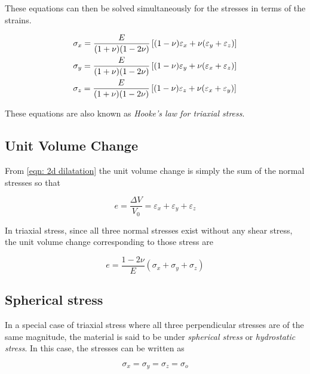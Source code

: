 \documentclass[
fontsize=10pt,
a4paper,
twosides=false,
open=any,
svgnames,
]{kaobook} %
\begin{document}
These equations can then be solved simultaneously for the stresses in terms of the strains.

\begin{equation}
  \begin{gathered}
    \sigma_x = \frac{E}{(1 + \nu )(1 - 2\nu )}\left[ (1 - \nu )\varepsilon_x + \nu (\varepsilon_y + \varepsilon_z) \right] \hfill \\
    \sigma_y = \frac{E}{(1 + \nu )(1 - 2\nu )}\left[ (1 - \nu )\varepsilon_y + \nu (\varepsilon_x + \varepsilon_z) \right] \hfill \\
    \sigma_z = \frac{E}{(1 + \nu )(1 - 2\nu )}\left[ (1 - \nu )\varepsilon_z + \nu (\varepsilon_x + \varepsilon_y) \right] \hfill \\ 
  \end{gathered}
\end{equation}

These equations are also known as \emph{Hooke’s law for triaxial stress}.

\subsection{Unit Volume Change}

From \cref{eqn: 2d dilatation} the unit volume change is simply the sum of the normal stresses so that

\begin{equation}
  e = \frac{\Delta V}{V_0} = \varepsilon_x + \varepsilon_y + \varepsilon _z
\end{equation}

In triaxial stress, since all three normal stresses exist without any shear stress, the unit volume change corresponding to those stress are

\begin{equation}
  e = \frac{1 - 2\nu}{E}(\sigma_x + \sigma_y + \sigma_z)
\end{equation}

\subsection{Spherical stress}

In a special case of triaxial stress where all three perpendicular stresses are of the same magnitude, the material is said to be under \emph{spherical stress} or \emph{hydrostatic stress}. In this case, the stresses can be written as

\[\sigma_x = \sigma_y = \sigma_z = \sigma_o\]
\end{document}
